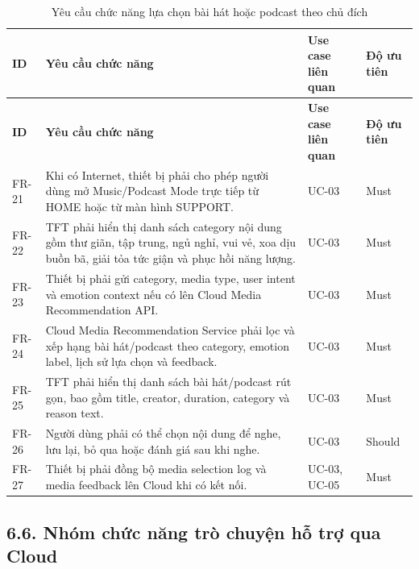 \documentclass[12pt,a4paper]{article}
\begin{document}
\begin{center}
\scriptsize
\begin{longtable}{|P{0.12\textwidth}|P{0.44\textwidth}|P{0.24\textwidth}|P{0.12\textwidth}|}
\caption{Yêu cầu chức năng lựa chọn bài hát hoặc podcast theo chủ đích}\\
\hline
\textbf{ID} & \textbf{Yêu cầu chức năng} & \textbf{Use case liên quan} & \textbf{Độ ưu tiên} \\
\hline
\endfirsthead
\hline
\textbf{ID} & \textbf{Yêu cầu chức năng} & \textbf{Use case liên quan} & \textbf{Độ ưu tiên} \\
\hline
\endhead
FR-21 & Khi có Internet, thiết bị phải cho phép người dùng mở Music/Podcast Mode trực tiếp từ HOME hoặc từ màn hình SUPPORT. & UC-03 & Must \\
\hline
FR-22 & TFT phải hiển thị danh sách category nội dung gồm thư giãn, tập trung, ngủ nghỉ, vui vẻ, xoa dịu buồn bã, giải tỏa tức giận và phục hồi năng lượng. & UC-03 & Must \\
\hline
FR-23 & Thiết bị phải gửi category, media type, user intent và emotion context nếu có lên Cloud Media Recommendation API. & UC-03 & Must \\
\hline
FR-24 & Cloud Media Recommendation Service phải lọc và xếp hạng bài hát/podcast theo category, emotion label, lịch sử lựa chọn và feedback. & UC-03 & Must \\
\hline
FR-25 & TFT phải hiển thị danh sách bài hát/podcast rút gọn, bao gồm title, creator, duration, category và reason text. & UC-03 & Must \\
\hline
FR-26 & Người dùng phải có thể chọn nội dung để nghe, lưu lại, bỏ qua hoặc đánh giá sau khi nghe. & UC-03 & Should \\
\hline
FR-27 & Thiết bị phải đồng bộ media selection log và media feedback lên Cloud khi có kết nối. & UC-03, UC-05 & Must \\
\hline
\end{longtable}
\normalsize
\end{center}

\subsection*{6.6. Nhóm chức năng trò chuyện hỗ trợ qua Cloud}
\end{document}
